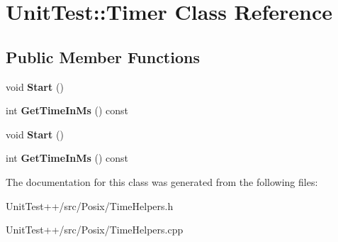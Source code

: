 \hypertarget{classUnitTest_1_1Timer}{\section{Unit\-Test\-:\-:Timer Class Reference}
\label{classUnitTest_1_1Timer}
}
\subsection*{Public Member Functions}
\begin{DoxyCompactItemize}
\item 
\hypertarget{classUnitTest_1_1Timer_acb9c2831775e37497e40f3df652eb9d9}{void {\bfseries Start} ()}\label{classUnitTest_1_1Timer_acb9c2831775e37497e40f3df652eb9d9}

\item 
\hypertarget{classUnitTest_1_1Timer_a7c57348b70099e7cc49da22a1af469f8}{int {\bfseries Get\-Time\-In\-Ms} () const }\label{classUnitTest_1_1Timer_a7c57348b70099e7cc49da22a1af469f8}

\item 
\hypertarget{classUnitTest_1_1Timer_acb9c2831775e37497e40f3df652eb9d9}{void {\bfseries Start} ()}\label{classUnitTest_1_1Timer_acb9c2831775e37497e40f3df652eb9d9}

\item 
\hypertarget{classUnitTest_1_1Timer_a7c57348b70099e7cc49da22a1af469f8}{int {\bfseries Get\-Time\-In\-Ms} () const }\label{classUnitTest_1_1Timer_a7c57348b70099e7cc49da22a1af469f8}

\end{DoxyCompactItemize}


The documentation for this class was generated from the following files\-:\begin{DoxyCompactItemize}
\item 
Unit\-Test++/src/\-Posix/Time\-Helpers.\-h\item 
Unit\-Test++/src/\-Posix/Time\-Helpers.\-cpp\end{DoxyCompactItemize}
